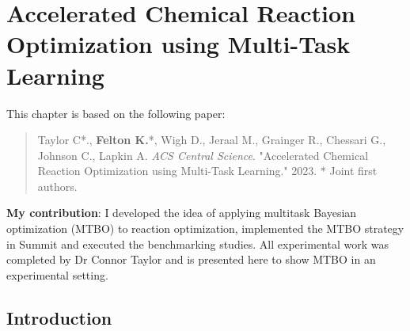 \chapter{Accelerated Chemical Reaction Optimization using Multi-Task Learning}\label{ch:mtbo} 
This chapter is based on the following paper:

\begin{quote}
    Taylor C*., \textbf{Felton K.}*, Wigh D., Jeraal M., Grainger R., Chessari G., Johnson C., Lapkin A. \textit{ACS Central Science}. "Accelerated Chemical Reaction Optimization using Multi-Task Learning." 2023.
    * Joint first authors.
\end{quote}
\textbf{My contribution}: I developed  the idea of applying multitask Bayesian optimization (MTBO) to reaction optimization, implemented the MTBO strategy in Summit and executed the benchmarking studies. All experimental work was completed by Dr Connor Taylor and is presented here to show MTBO in an experimental setting.

\section{Introduction}


